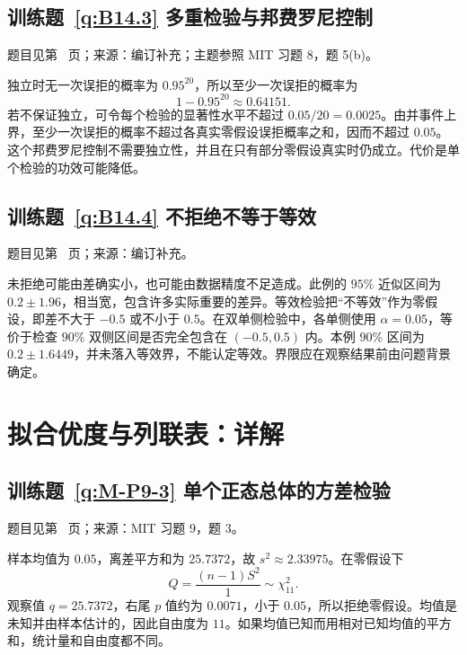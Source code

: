 \documentclass[UTF8,12pt,a4paper,fontset=fandol]{ctexbook}
\begin{document}
\subsection*{训练题~\ref{q:B14.3} 多重检验与邦费罗尼控制}\label{a:B14.3}{\small 题目见第~\pageref{q:B14.3} 页；来源：编订补充；主题参照 MIT 习题 8，题 5(b)。}
\begin{solve}独立时无一次误拒的概率为 $0.95^{20}$，所以至少一次误拒的概率为\[1-0.95^{20}\approx0.64151.\]若不保证独立，可令每个检验的显著性水平不超过 $0.05/20=0.0025$。由并事件上界，至少一次误拒的概率不超过各真实零假设误拒概率之和，因而不超过 $0.05$。这个邦费罗尼控制不需要独立性，并且在只有部分零假设真实时仍成立。代价是单个检验的功效可能降低。\end{solve}

\subsection*{训练题~\ref{q:B14.4} 不拒绝不等于等效}\label{a:B14.4}{\small 题目见第~\pageref{q:B14.4} 页；来源：编订补充。}
\begin{solve}未拒绝可能由差确实小，也可能由数据精度不足造成。此例的 $95\%$ 近似区间为 $0.2\pm1.96$，相当宽，包含许多实际重要的差异。等效检验把“不等效”作为零假设，即差不大于 $-0.5$ 或不小于 $0.5$。在双单侧检验中，各单侧使用 $\alpha=0.05$，等价于检查 $90\%$ 双侧区间是否完全包含在 $(-0.5,0.5)$ 内。本例 $90\%$ 区间为 $0.2\pm1.6449$，并未落入等效界，不能认定等效。界限应在观察结果前由问题背景确定。\end{solve}

\clearpage\section*{拟合优度与列联表：详解}

\subsection*{训练题~\ref{q:M-P9-3} 单个正态总体的方差检验}\label{a:M-P9-3}{\small 题目见第~\pageref{q:M-P9-3} 页；来源：MIT 习题 9，题 3。}
\begin{solve}样本均值为 $0.05$，离差平方和为 $25.7372$，故 $s^2\approx2.33975$。在零假设下\[Q=\frac{(n-1)S^2}{1}\sim\chi^2_{11}.\]观察值 $q=25.7372$，右尾 $p$ 值约为 $0.0071$，小于 $0.05$，所以拒绝零假设。均值是未知并由样本估计的，因此自由度为 $11$。如果均值已知而用相对已知均值的平方和，统计量和自由度都不同。\end{solve}
\end{document}
